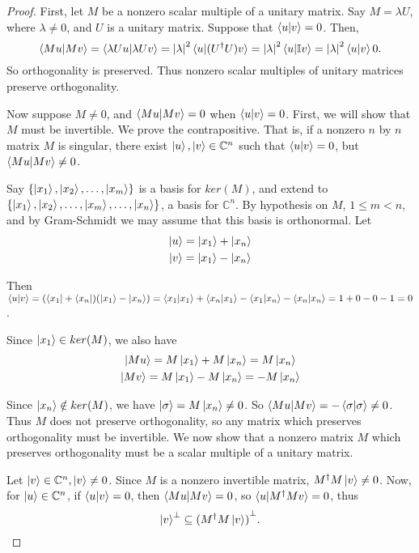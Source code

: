 \begin{proof}
First, let $M$ be a nonzero scalar multiple of a unitary matrix. Say $M=\lambda U$, where $\lambda \ne 0$, and $U$ is a unitary matrix.  Suppose that $\braket{u|v}=0$.  Then,
$$\braket{Mu|Mv}=\braket{\lambda Uu|\lambda Uv}={|\lambda|}^2 \braket{u|(U^\dagger U)v}={|\lambda|}^2 \braket{u|\mathbb{I}v}={|\lambda|}^2 \braket{u|v}0.$$ So orthogonality is preserved.  Thus nonzero scalar multiples of unitary matrices preserve orthogonality.

Now suppose $M\neq0$, and $\braket{Mu|Mv}=0$ when $\braket{u|v}=0$. First, we will show that $M$ must be invertible.  We prove the contrapositive.  That is, if a nonzero $n$ by $n$ matrix $M$ is singular, there exist $\ket{u}, \ket{v} \in \mathbb{C}^n$ such that $\braket{u|v}=0$, but $\braket{Mu|Mv} \ne 0$.

Say $\{\ket{x_1}, \ket{x_2},\hdots, \ket{x_m}\}$ is a basis for $ker(M)$, and extend to $\{\ket{x_1}, \ket{x_2},\hdots, \ket{x_m}, \hdots, \ket{x_n}\}$, a basis for ${\mathbb{C}}^n$.  By hypothesis on $M$, $1 \leq m <n$, and by Gram-Schmidt we may assume that this basis is orthonormal.  Let
\begin{gather*}
    \ket{u}=\ket{x_1}+\ket{x_n}\\
    \ket{v}=\ket{x_1}-\ket{x_n}
\end{gather*}

Then $\braket{u|v}=(\bra{x_1}+\bra{x_n})(\ket{x_1}-\ket{x_n})=\braket{x_1|x_1}+\braket{x_n|x_1}-\braket{x_1|x_n}-\braket{x_n|x_n}=1+0-0-1=0$.

Since $\ket{x_1} \in ker(M)$, we also have
\begin{gather*}
    \ket{Mu}=M\ket{x_1}+M\ket{x_n}=M\ket{x_n}\\
    \ket{Mv}=M\ket{x_1}-M\ket{x_n}=-M\ket{x_n}    
\end{gather*}

Since $\ket{x_n} \notin ker(M)$, we have $\ket{\sigma}=M\ket{x_n} \ne 0$. So $\braket{Mu|Mv}=-\braket{\sigma|\sigma} \ne 0$. Thus $M$ does not preserve orthogonality, so any matrix which preserves orthogonality must be invertible.  We now show that a nonzero matrix $M$ which preserves orthogonality must be a scalar multiple of a unitary matrix.

Let $\ket{v} \in \mathbb{C}^n, \ket{v} \ne 0$.  Since $M$ is a nonzero invertible matrix, $M^\dagger M \ket{v} \ne 0$.  Now, for $\ket{u} \in \mathbb{C}^n$, if $\braket{u|v}=0$, then $\braket{Mu|Mv}=0$, so $\braket{u|M^\dagger Mv}=0$, thus
$$\ket{v}^\perp \subseteq {(M^\dagger M\ket{v})}^\perp.$$


\end{proof}
